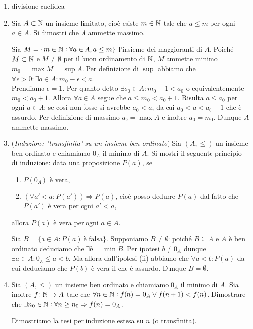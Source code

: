\documentclass[a4paper]{article}\par \usepackage{style}\par
\begin{document}
\begin{enumerate}
\item \textsf{divisione euclidea}
\item Sia $ A \subset \mathbb{N} $ un insieme limitato, cioè esiste $ m \in \mathbb{N} $ tale che $ a \leq m $ per ogni $ a \in A $. Si dimostri che $ A $ ammette massimo. \\\par   Sia $ M = \{m \in \mathbb{N} : \forall a \in A, a \leq m\} $ l'insieme dei maggioranti di $ A $. Poiché $ M \subset \mathbb{N} $ e $ M \neq \emptyset $ per il buon ordinamento di $ \mathbb{N} $, $ M $ ammette minimo $ m_0 = \max M = \sup A $. Per definizione di $ \sup $ abbiamo che $ \forall \epsilon > 0 : \exists a \in A : m_0 - \epsilon < a $. \\
  Prendiamo $ \epsilon = 1 $. Per quanto detto $ \exists a_0 \in A : m_0 - 1 < a_0 $ o equivalentemente $ m_0 < a_0 + 1 $. Allora $ \forall a \in A $ segue che $ a \leq m_0 < a_0 + 1 $. Risulta $ a \leq a_0 $ per ogni $ a \in A $: se così non fosse si avrebbe $ a_0 < a $, da cui $ a_0 < a < a_0 + 1 $ che è assurdo. Per definizione di massimo $ a_0 = \max A $ e inoltre $ a_0 = m_0 $. Dunque $ A $ ammette massimo.
\item (\emph{Induzione "transfinita" su un insieme ben ordinato}) Sia $ (A, \leq) $ un insieme ben ordinato e chiamiamo $ 0_A $ il minimo di $ A $. Si mostri il seguente principio di induzione: data una proposizione $ P(a) $, se
  \begin{enumerate}[label=(\roman*)]
  \item $ P(0_A) $ è vera,
  \item $ (\forall a' < a : P(a')) \Rightarrow P(a) $, cioè posso dedurre $ P(a) $ dal fatto che $ P(a') $ è vera per ogni $ a' < a $,
  \end{enumerate}
  allora $ P(a) $ è vera per ogni $ a \in A $. \\\par   Sia $ B = \{a \in A : P(a) \; \text{è falsa}\} $. Supponiamo $ B \neq \emptyset $: poiché $ B \subseteq A $ e $ A $ è ben ordinato deduciamo che $ \exists b = \min B $. Per ipotesi $ b \neq 0_A $ dunque $ \exists a \in A : 0_A \leq a < b $. Ma allora dall'ipotesi (ii) abbiamo che $ \forall a < b : P(a) $ da cui deduciamo che $ P(b) $ è vera il che è assurdo. Dunque $ B = \emptyset $.
\item Sia $ (A, \leq) $ un insieme ben ordinato e chiamiamo $ 0_A $ il minimo di $ A $. Sia inoltre $ f \colon \mathbb{N} \to A $ tale che $ \forall n \in \mathbb{N} : f(n) = 0_A \vee f(n + 1) < f(n) $. Dimostrare che $ \exists n_0 \in \mathbb{N} : \forall n \geq n_0 \Rightarrow f(n) = 0_A $. \\\par   Dimostriamo la tesi per induzione estesa su $ n $ (o transfinita).

\end{enumerate}
\end{document}
